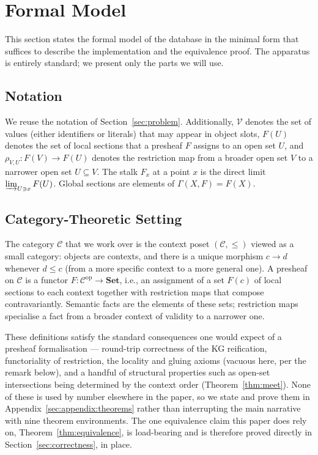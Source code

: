 \section{Formal Model}
\label{sec:mathematical_model}

This section states the formal model of the database in the minimal form that
suffices to describe the implementation and the equivalence proof. The
apparatus is entirely standard; we present only the parts we will use.

\subsection{Notation}
\label{sec:notation}

We reuse the notation of Section~\ref{sec:problem}. Additionally, $\mathcal{V}$
denotes the set of values (either identifiers or literals) that may appear in
object slots, $F(U)$ denotes the set of local sections that a presheaf $F$
assigns to an open set $U$, and $\rho_{V, U}: F(V) \to F(U)$ denotes the
restriction map from a broader open set $V$ to a narrower open set $U \subseteq V$.
The stalk $F_x$ at a point $x$ is the direct limit $\varinjlim_{U \ni x} F(U)$.
Global sections are elements of $\Gamma(X, F) = F(X)$.

\subsection{Category-Theoretic Setting}
\label{sec:categorical}

The category $\mathcal{C}$ that we work over is the context poset $(\mathcal{C}, \leq)$
viewed as a small category: objects are contexts, and there is a unique morphism
$c \to d$ whenever $d \leq c$ (from a more specific context to a more general
one). A presheaf on $\mathcal{C}$ is a functor
$F: \mathcal{C}^{\mathrm{op}} \to \mathbf{Set}$, i.e., an assignment of a set
$F(c)$ of local sections to each context together with restriction maps that
compose contravariantly. Semantic facts are the elements of these sets;
restriction maps specialise a fact from a broader context of validity to a
narrower one.



These definitions satisfy the standard consequences one would expect of a
presheaf formalisation --- round-trip correctness of the KG reification,
functoriality of restriction, the locality and gluing axioms (vacuous
here, per the remark below), and a handful of structural properties such
as open-set intersections being determined by the context order
(Theorem~\ref{thm:meet}). None of these is
used by number elsewhere in the paper, so we state and prove them in
Appendix~\ref{sec:appendix:theorems} rather than interrupting the main
narrative with nine theorem environments. The one equivalence claim this
paper does rely on, Theorem~\ref{thm:equivalence}, is load-bearing and is
therefore proved directly in Section~\ref{sec:correctness}, in place.

